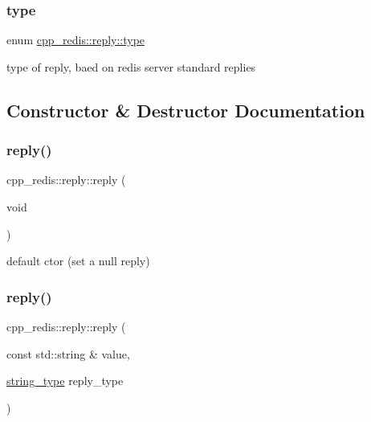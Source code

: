 \subsubsection{\texorpdfstring{type}{type}}
{\footnotesize\ttfamily enum \hyperlink{classcpp__redis_1_1reply_acc272b2a52164cac1d110c619a0b25bd}{cpp\+\_\+redis\+::reply\+::type}\hspace{0.3cm}{\ttfamily [strong]}}

type of reply, baed on redis server standard replies 

\subsection{Constructor \& Destructor Documentation}
\mbox{\label{classcpp__redis_1_1reply_a8d0b1f8a18b5c7c3ce79784604dba6cc}} 
\subsubsection{\texorpdfstring{reply()}{reply()}\hspace{0.1cm}{\footnotesize\ttfamily [1/4]}}
{\footnotesize\ttfamily cpp\+\_\+redis\+::reply\+::reply (\begin{DoxyParamCaption}\item[{void}]{ }\end{DoxyParamCaption})}

default ctor (set a null reply) \mbox{\label{classcpp__redis_1_1reply_a58fb2a051a001f1c3dcf2cd957441dbc}} 
\subsubsection{\texorpdfstring{reply()}{reply()}\hspace{0.1cm}{\footnotesize\ttfamily [2/4]}}
{\footnotesize\ttfamily cpp\+\_\+redis\+::reply\+::reply (\begin{DoxyParamCaption}\item[{const std\+::string \&}]{value,  }\item[{\hyperlink{classcpp__redis_1_1reply_ac192ba4cb8f2bb6e7cb465edf755328b}{string\+\_\+type}}]{reply\+\_\+type }\end{DoxyParamCaption})}

